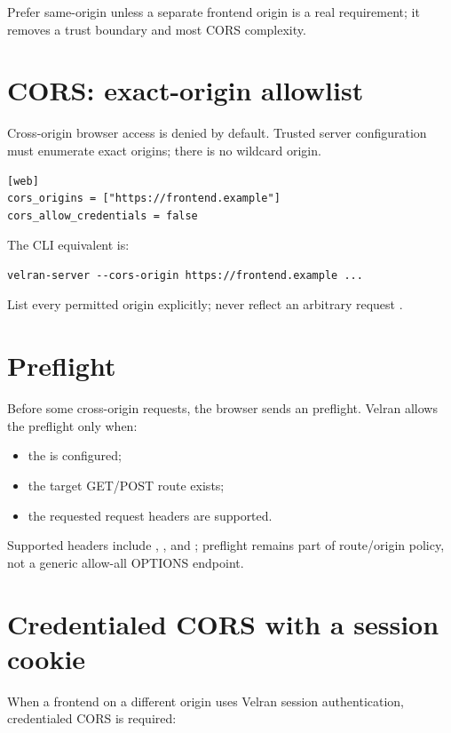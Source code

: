 Prefer same-origin unless a separate frontend origin is a real requirement; it removes a trust boundary and most CORS complexity.

\section{CORS: exact-origin allowlist}

Cross-origin browser access is denied by default. Trusted server configuration must enumerate exact origins; there is no wildcard origin.

\begin{lstlisting}
[web]
cors_origins = ["https://frontend.example"]
cors_allow_credentials = false
\end{lstlisting}

The CLI equivalent is:

\begin{lstlisting}
velran-server --cors-origin https://frontend.example ...
\end{lstlisting}

List every permitted origin explicitly; never reflect an arbitrary request .

\section{Preflight}

Before some cross-origin requests, the browser sends an  preflight. Velran allows the preflight only when:

\begin{itemize}
  \item the  is configured;
  \item the target GET/POST route exists;
  \item the requested request headers are supported.
\end{itemize}

Supported headers include , , and ; preflight remains part of route/origin policy, not a generic allow-all OPTIONS endpoint.

\section{Credentialed CORS with a session cookie}

When a frontend on a different origin uses Velran session authentication, credentialed CORS is required:

